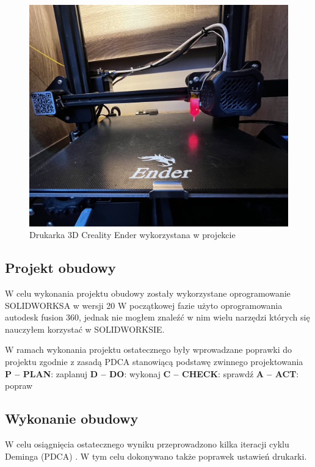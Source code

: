 \documentclass[a4paper,12pt,reqno]{article}
\begin{document}
\begin{figure}[H]%
\centering
\includegraphics[width=0.8\columnwidth]{imgs/ender3v2.jpg}
\caption{Drukarka 3D Creality Ender wykorzystana w projekcie \label{ender3d}}
\quad
\end{figure}

\subsection{Projekt obudowy}
W celu wykonania projektu obudowy zostały wykorzystane oprogramowanie SOLIDWORKSA	 w wersji 20
W początkowej fazie użyto oprogramowania autodesk fusion 360, jednak nie mogłem znaleźć w nim wielu narzędzi których się nauczyłem korzystać w SOLIDWORKSIE.

W ramach wykonania projektu ostatecznego były wprowadzane poprawki do projektu zgodnie z zasadą PDCA stanowiącą podstawę zwinnego projektowania \newline
\textbf{P – PLAN}: zaplanuj \newline
\textbf{D – DO}: wykonaj \newline
\textbf{C – CHECK}: sprawdź \newline
\textbf{A – ACT}: popraw

\subsection{Wykonanie obudowy}
W celu osiągnięcia ostatecznego wyniku przeprowadzono kilka iteracji cyklu Deminga (PDCA) \cite{leanByJK}. W tym celu dokonywano także poprawek ustawień drukarki.
\end{document}

